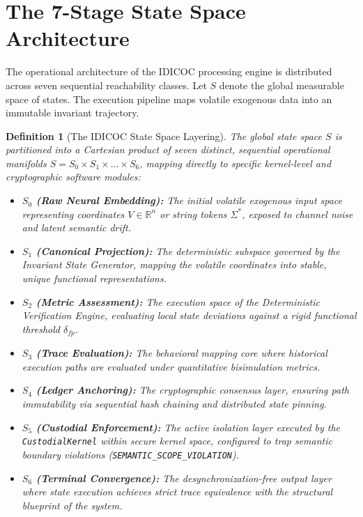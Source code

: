 \documentclass[11pt,a4paper]{article}
\newtheorem{definition}[theorem]{Definition}
\begin{document}
\section{The 7-Stage State Space Architecture}
The operational architecture of the IDICOC processing engine is distributed across seven sequential reachability classes. Let $S$ denote the global measurable space of states. The execution pipeline maps volatile exogenous data into an immutable invariant trajectory.

\begin{definition}[The IDICOC State Space Layering]
The global state space $S$ is partitioned into a Cartesian product of seven distinct, sequential operational manifolds $S = S_0 \times S_1 \times \dots \times S_6$, mapping directly to specific kernel-level and cryptographic software modules:
\begin{itemize}
    \item \textbf{$S_0$ (Raw Neural Embedding):} The initial volatile exogenous input space representing coordinates $V \in \mathbb{R}^n$ or string tokens $\Sigma^*$, exposed to channel noise and latent semantic drift.
    \item \textbf{$S_1$ (Canonical Projection):} The deterministic subspace governed by the Invariant State Generator, mapping the volatile coordinates into stable, unique functional representations.
    \item \textbf{$S_2$ (Metric Assessment):} The execution space of the Deterministic Verification Engine, evaluating local state deviations against a rigid functional threshold $\delta_{fp}$.
    \item \textbf{$S_3$ (Trace Evaluation):} The behavioral mapping core where historical execution paths are evaluated under quantitative bisimulation metrics.
    \item \textbf{$S_4$ (Ledger Anchoring):} The cryptographic consensus layer, ensuring path immutability via sequential hash chaining and distributed state pinning.
    \item \textbf{$S_5$ (Custodial Enforcement):} The active isolation layer executed by the \texttt{CustodialKernel} within secure kernel space, configured to trap semantic boundary violations (\texttt{SEMANTIC\_SCOPE\_VIOLATION}).
    \item \textbf{$S_6$ (Terminal Convergence):} The desynchronization-free output layer where state execution achieves strict trace equivalence with the structural blueprint of the system.
\end{itemize}
\end{definition}
\end{document}
